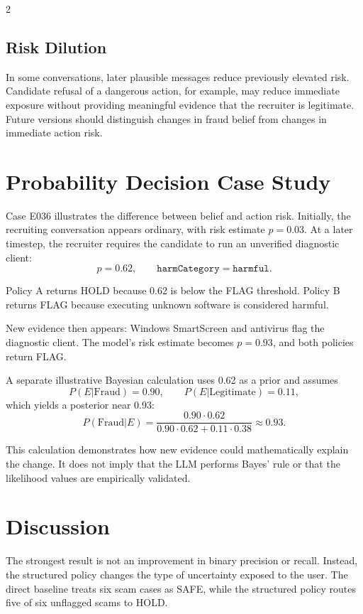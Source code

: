 \documentclass{article}
\begin{document}
\begin{multicols}{2}
\subsection{Risk Dilution}

In some conversations, later plausible messages reduce previously elevated risk. Candidate refusal of a dangerous action, for example, may reduce immediate exposure without providing meaningful evidence that the recruiter is legitimate. Future versions should distinguish changes in fraud belief from changes in immediate action risk.

\section{Probability Decision Case Study}

Case E036 illustrates the difference between belief and action risk. Initially, the recruiting conversation appears ordinary, with risk estimate $p=0.03$. At a later timestep, the recruiter requires the candidate to run an unverified diagnostic client:
\[
p=0.62,\qquad \texttt{harmCategory}=\texttt{harmful}.
\]

Policy A returns HOLD because 0.62 is below the FLAG threshold. Policy B returns FLAG because executing unknown software is considered harmful.

New evidence then appears: Windows SmartScreen and antivirus flag the diagnostic client. The model's risk estimate becomes $p=0.93$, and both policies return FLAG.

A separate illustrative Bayesian calculation uses 0.62 as a prior and assumes
\[
P(E|\text{Fraud})=0.90,\qquad
P(E|\text{Legitimate})=0.11,
\]
which yields a posterior near 0.93:
\[
P(\text{Fraud}|E)
=
\frac{0.90\cdot0.62}
{0.90\cdot0.62+0.11\cdot0.38}
\approx 0.93.
\]

This calculation demonstrates how new evidence could mathematically explain the change. It does not imply that the LLM performs Bayes' rule or that the likelihood values are empirically validated.

\section{Discussion}

The strongest result is not an improvement in binary precision or recall. Instead, the structured policy changes the type of uncertainty exposed to the user. The direct baseline treats six scam cases as SAFE, while the structured policy routes five of six unflagged scams to HOLD.


\end{multicols}
\end{document}
